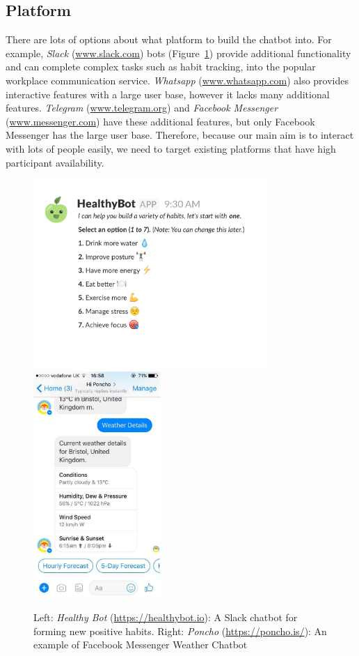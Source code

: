 \subsection{Platform}

There are lots of options about what platform to build the chatbot into. For example, \textit{Slack} (\url{www.slack.com}) bots (Figure~\ref{fig:healthy_bot_and_poncho}) provide additional functionality and can complete complex tasks such as habit tracking, into the popular workplace communication service. \textit{Whatsapp} (\url{www.whatsapp.com}) also provides interactive features with a large user base, however it lacks many additional features. \textit{Telegram} (\url{www.telegram.org}) and \textit{Facebook Messenger} (\url{www.messenger.com}) have these additional features, but only Facebook Messenger has the large user base. Therefore, because our main aim is to interact with lots of people easily, we need to target existing platforms that have high participant availability.

\begin{figure}[H]
  \centering
  \includegraphics[width=3.5in]{../resources/existing-bots/healthy-bot.png}
  \hspace{10px}
  \includegraphics[width=1.9in]{../resources/existing-bots/poncho.jpg}
  \caption{Left: \textit{Healthy Bot} (\url{https://healthybot.io}): A Slack chatbot for forming new positive habits. Right: \textit{Poncho} (\url{https://poncho.is/}): An example of Facebook Messenger Weather Chatbot}
  \label{fig:healthy_bot_and_poncho}
\end{figure}


